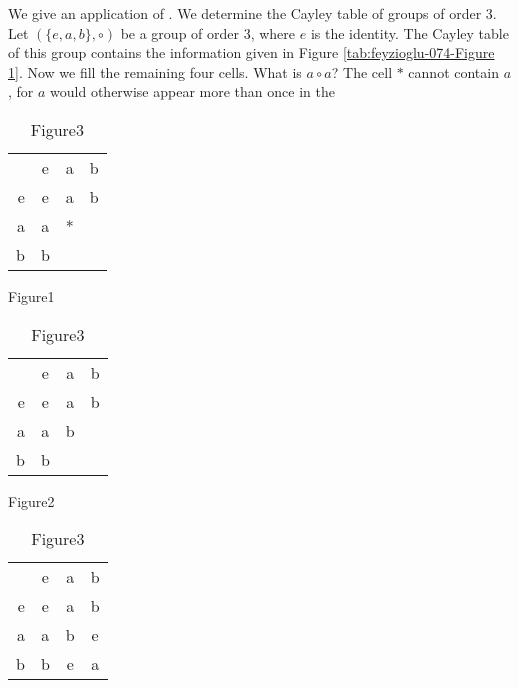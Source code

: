 \documentclass[11pt]{amsbook}
\begin{document}
We give an application of . We determine the Cayley table of groups of order 3. Let $(\{e,a,b\},\circ)$ be  a group of order 3, where $e$ is the identity. The Cayley table of this group contains the information given in Figure \ref{tab:feyzioglu-074-Figure 1}. Now we fill the remaining four cells. What is $a \circ a$? The cell $*$ cannot contain $a$, for $a$ would otherwise appear more than once in the

\begin{table}[h]\centering
    \begin{minipage}{.3\textwidth}
        \begin{tabular}{ r | c | c | c | }
            \multicolumn{1}{r}{}
             & \multicolumn{1}{c}{e}
             & \multicolumn{1}{c}{a}
             & \multicolumn{1}{c}{b} \\
            \cline{2-4}
            e & e & a & b \\
            \cline{2-4}
            a & a & * & \\
            \cline{2-4}
            b & b & & \\
            \cline{2-4}
        \end{tabular}
        \caption{Figure1}
        \label{tab:feyzioglu-074-Figure 1}
    \end{minipage}
    \begin{minipage}{.3\textwidth}
        \begin{tabular}{ r | c | c | c | }
            \multicolumn{1}{r}{}
             & \multicolumn{1}{c}{e}
             & \multicolumn{1}{c}{a}
             & \multicolumn{1}{c}{b} \\
            \cline{2-4}
            e & e & a & b \\
            \cline{2-4}
            a & a & b & \\
            \cline{2-4}
            b & b & & \\
            \cline{2-4}
        \end{tabular}
        \caption{Figure2}
        \label{tab:feyzioglu-074-Figure 2}
    \end{minipage}
    \begin{minipage}{.3\textwidth}
        \begin{tabular}{ r | c | c | c | }
            \multicolumn{1}{r}{}
             & \multicolumn{1}{c}{e}
             & \multicolumn{1}{c}{a}
             & \multicolumn{1}{c}{b} \\
            \cline{2-4}
            e & e & a & b \\
            \cline{2-4}
            a & a & b & e \\
            \cline{2-4}
            b & b & e & a \\
            \cline{2-4}
        \end{tabular}
        \caption{Figure3}
        \label{tab:feyzioglu-074-Figure 3}
    \end{minipage}
\end{table}
\end{document}
